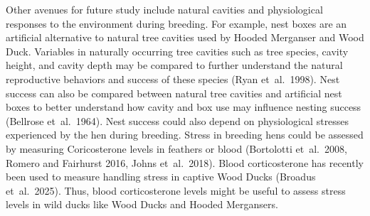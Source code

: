 Other avenues for future study include natural cavities and physiological responses to the environment during breeding. For example, nest boxes are an artificial alternative to natural tree cavities used by Hooded Merganser and Wood Duck. Variables in naturally occurring tree cavities such as tree species, cavity height, and cavity depth may be compared to further understand the natural reproductive behaviors and success of these species (Ryan et~al.~1998). Nest success can also be compared between natural tree cavities and artificial nest boxes to better understand how cavity and box use may influence nesting success (Bellrose et~al.~1964).  Nest success could also depend on physiological stresses experienced by the hen during breeding. Stress in breeding hens could be assessed by measuring Coricosterone levels in feathers or blood (Bortolotti et~al.~2008, Romero and Fairhurst 2016, Johns et~al.~2018). Blood corticosterone has recently been used to measure handling stress in captive Wood Ducks (Broadus et~al.~2025). Thus, blood corticosterone levels might be useful to assess stress levels in wild ducks like Wood Ducks and Hooded Mergansers.  



